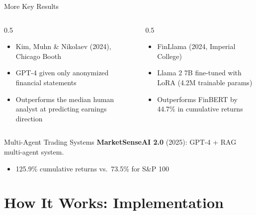 \documentclass[aspectratio=169]{beamer}
\begin{document}
\begin{frame}{More Key Results}
\begin{columns}[T]
\begin{column}{0.5\textwidth}
\begin{shadedbox}[title=\textbf{GPT-4 vs.\ Human Analysts}]
\begin{itemize}\footnotesize
  \item Kim, Muhn \& Nikolaev (2024), Chicago Booth
  \item GPT-4 given only anonymized financial statements
  \item \alert{Outperforms the median human analyst} at predicting earnings direction
\end{itemize}
\end{shadedbox}
\end{column}
\begin{column}{0.5\textwidth}
\begin{shadedbox}[title=\textbf{Fine-Tuned Small Models}]
\begin{itemize}\footnotesize
  \item FinLlama (2024, Imperial College)
  \item Llama 2 7B fine-tuned with LoRA (4.2M trainable params)
  \item Outperforms FinBERT by \alert{44.7\%} in cumulative returns
\end{itemize}
\end{shadedbox}
\end{column}
\end{columns}
\end{frame}

\begin{frame}{Multi-Agent Trading Systems}
\textbf{MarketSenseAI 2.0} (2025): GPT-4 + RAG multi-agent system.
\begin{itemize}\footnotesize
  \item \alert{125.9\% cumulative returns} vs.\ 73.5\% for S\&P 100
\end{itemize}
\end{frame}

\section{How It Works: Implementation}
\end{document}
